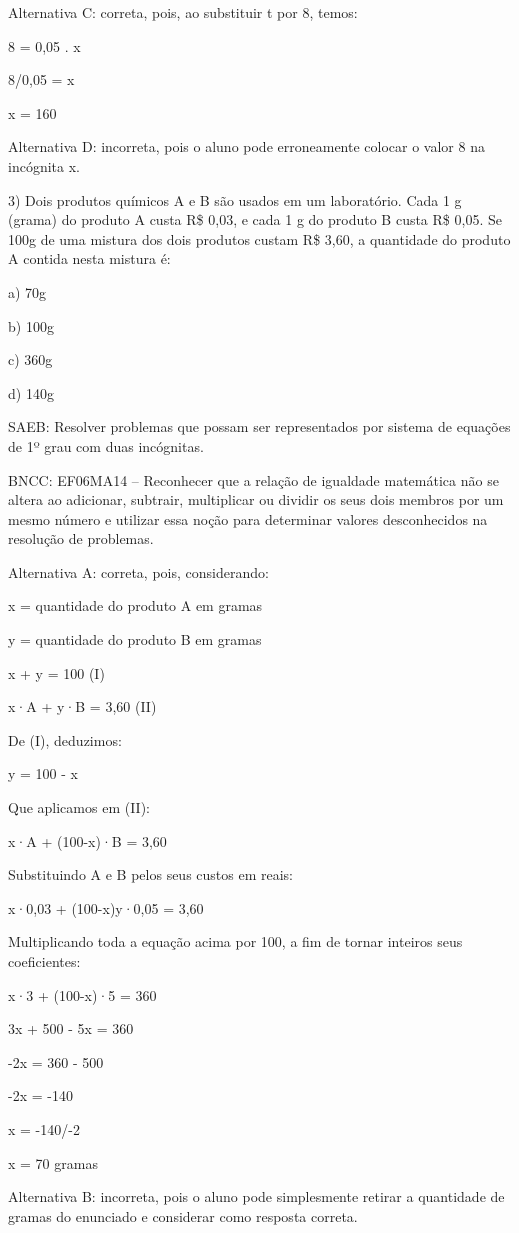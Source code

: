 Alternativa C: correta, pois, ao substituir t por 8, temos:

8 = 0,05 . x

8/0,05 = x

x = 160

Alternativa D: incorreta, pois o aluno pode erroneamente colocar o valor
8 na incógnita x.

3) Dois produtos químicos A e B são usados em um laboratório. Cada 1 g
(grama) do produto A custa R\$ 0,03, e cada 1 g do produto B custa R\$
0,05. Se 100g de uma mistura dos dois produtos custam R\$ 3,60, a
quantidade do produto A contida nesta mistura é:

a) 70g

b) 100g

c) 360g

d) 140g

SAEB: Resolver problemas que possam ser representados por sistema de
equações de 1º grau com duas incógnitas.

BNCC: EF06MA14 -- Reconhecer que a relação de igualdade matemática não
se altera ao adicionar, subtrair, multiplicar ou dividir os seus dois
membros por um mesmo número e utilizar essa noção para determinar
valores desconhecidos na resolução de problemas.

Alternativa A: correta, pois, considerando:

x = quantidade do produto A em gramas

y = quantidade do produto B em gramas

x + y = 100 (I)

x·A + y·B = 3,60 (II)

De (I), deduzimos:

y = 100 - x

Que aplicamos em (II):

x·A + (100-x)·B = 3,60

Substituindo A e B pelos seus custos em reais:

x·0,03 + (100-x)y·0,05 = 3,60

Multiplicando toda a equação acima por 100, a fim de tornar inteiros
seus coeficientes:

x·3 + (100-x)·5 = 360

3x + 500 - 5x = 360

-2x = 360 - 500

-2x = -140

x = -140/-2

x = 70 gramas

Alternativa B: incorreta, pois o aluno pode simplesmente retirar a
quantidade de gramas do enunciado e considerar como resposta correta.

